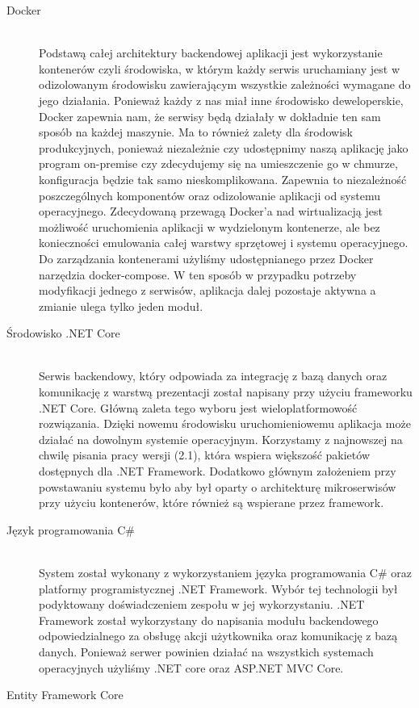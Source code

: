\documentclass[a4paper,11pt,twoside]{report}
\theoremstyle{definition}
\begin{document}
\begin{description}
\item [Docker] \hfill \\
Podstawą całej architektury backendowej aplikacji jest wykorzystanie kontenerów czyli środowiska, w którym każdy serwis uruchamiany jest w odizolowanym środowisku zawierającym wszystkie zależności wymagane do jego działania. Ponieważ każdy z nas miał inne środowisko deweloperskie, Docker zapewnia nam, że serwisy będą działały w dokładnie ten sam sposób na każdej maszynie. Ma to również zalety dla środowisk produkcyjnych, ponieważ niezależnie czy udostępnimy naszą aplikację jako program on-premise czy zdecydujemy się na umieszczenie go w chmurze, konfiguracja będzie tak samo nieskomplikowana. Zapewnia to niezależność poszczególnych komponentów oraz odizolowanie aplikacji od systemu operacyjnego. Zdecydowaną przewagą Docker’a nad wirtualizacją jest możliwość uruchomienia aplikacji w wydzielonym kontenerze, ale bez konieczności emulowania całej warstwy sprzętowej i systemu operacyjnego. Do zarządzania kontenerami użyliśmy udostępnianego przez Docker narzędzia docker-compose. W ten sposób w przypadku potrzeby modyfikacji jednego z serwisów, aplikacja dalej pozostaje aktywna a zmianie ulega tylko jeden moduł.
\item [Środowisko .NET Core] \hfill \\
Serwis backendowy, który odpowiada za integrację z bazą danych oraz komunikację z warstwą prezentacji został napisany przy użyciu frameworku .NET Core. Główną zaleta tego wyboru jest wieloplatformowość rozwiązania. Dzięki nowemu środowisku uruchomieniowemu aplikacja może działać na dowolnym systemie operacyjnym. Korzystamy z najnowszej na chwilę pisania pracy wersji (2.1), która wspiera większość pakietów dostępnych dla .NET Framework. Dodatkowo głównym założeniem przy powstawaniu systemu było aby był oparty o architekturę mikroserwisów przy użyciu kontenerów, które również są wspierane przez framework.
\item [Język programowania C\# ] \hfill \\
System został wykonany z wykorzystaniem języka programowania C\# oraz platformy programistycznej .NET Framework. Wybór tej technologii był podyktowany doświadczeniem zespołu w jej wykorzystaniu. .NET Framework został wykorzystany do napisania modułu backendowego odpowiedzialnego za obsługę akcji użytkownika oraz komunikację z bazą danych. Ponieważ serwer powinien działać na wszystkich systemach operacyjnych użyliśmy .NET core oraz ASP.NET MVC Core.
\item [Entity Framework Core] \hfill \\

\end{description}
\end{document}
